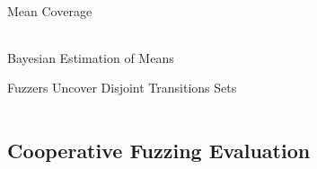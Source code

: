 \documentclass[\HandoutMode,table]{beamer}
\newcommand\figwidth\textwidth
\begin{document}
\begin{frame}{Mean Coverage}
    \begin{table}
        \scriptsize
        \begin{tabular}{l*{4}c}
            
        \end{tabular}
    \end{table}
\end{frame}

\begin{frame}{Bayesian Estimation of Means}
    \renewcommand\figwidth{.33\textwidth}
    \setcounter{subfigure}{0}
    \begin{figure}
    \end{figure}
\end{frame}

\begin{frame}{Fuzzers Uncover Disjoint Transitions Sets}
    \begin{table}
        \begin{tabular}{l c l c}
            
        \end{tabular}
    \end{table}
    \vspace{2\baselineskip}
\end{frame}

\subsection{Cooperative Fuzzing Evaluation}
\end{document}
